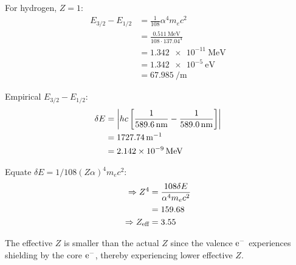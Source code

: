 \begin{parts}
	For hydrogen, $Z=1$:
	\begin{align*}
		E_{3/2} - E_{1/2} &= \frac{1}{108} \alpha^4 m_e c^2 \\
		&= \frac{\SI{0.511}{\mega\electronvolt}}{108\cdot\num{137.04}^4} \\
		&= \SI{1.342e-11}{\mega\electronvolt} \\
		&= \SI{1.342e-5}{\electronvolt} \\
		&= \SI{67.985}{\per\metre}
	\end{align*}
	
	Empirical $E_{3/2} - E_{1/2}$:
	\begin{align*}
		\delta E &= \left|hc \left[\frac{1}{\SI{589.6}{\nano\metre}} - \frac{1}{\SI{589.0}{\nano\metre}}\right]\right| \\
		&= \SI{1727.74}{\per\metre} \\
		&= \SI{2.142e-9}{\mega\electronvolt}
	\end{align*}
	
	Equate $\delta E = 1/108 (Z\alpha)^4 m_e c^2$:
	\begin{align*}
		\Rightarrow Z^4 &= \frac{108 \delta E}{\alpha^4 m_e c^2} \\
		&= \num{159.68} \\
		\Rightarrow Z_\textnormal{eff} &= \num{3.55}
	\end{align*}
	
	The effective $Z$ is smaller than the actual $Z$ since the valence $\mathrm{e}^{-}$ experiences shielding by the core $\mathrm{e}^{-}$, thereby experiencing lower effective $Z$.
\end{parts}
